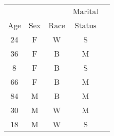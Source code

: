 \begin{tabular}{ccccc}
     &     &      & Marital \\
 Age & Sex & Race & Status \\
 24  & F  & W   & S  \\
 36  & F  & B   & M  \\
 8  & F  & B   & S  \\
 66  & F  & B   & M  \\
 84  & M  & B   & M  \\
 30  & M  & W   & M  \\
 18  & M  & W   & S  \\
\hline
\end{tabular}
